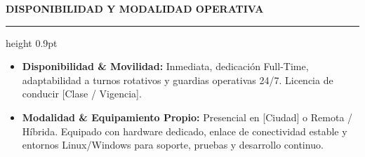 \documentclass[10pt,a4paper]{article}
\newcommand{\cvsection}[1]{%
  \vspace{5pt}%
  {\color{primary}\large\bfseries\MakeUppercase{#1}}\par\vspace{1.5pt}%
  {\color{secondary}\hrule height 0.9pt}\par\vspace{3pt}%
}
\begin{document}
\cvsection{Disponibilidad y Modalidad Operativa}
\begin{itemize}
    \item \textbf{Disponibilidad \& Movilidad:} Inmediata, dedicación Full-Time, adaptabilidad a turnos rotativos y guardias operativas 24/7. Licencia de conducir [Clase / Vigencia].
    \item \textbf{Modalidad \& Equipamiento Propio:} Presencial en [Ciudad] o Remota / Híbrida. Equipado con hardware dedicado, enlace de conectividad estable y entornos Linux/Windows para soporte, pruebas y desarrollo continuo.
\end{itemize}
\end{document}
